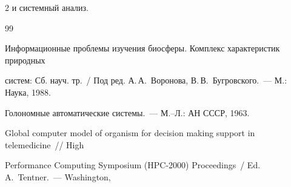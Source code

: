 \begin{multicols}{2}
и системный анализ.





{\small\frenchspacing


{%




\begin{thebibliography}{99}







Информационные проблемы изучения биосферы. Комплекс характеристик природных 


систем: Сб. науч. тр.~/ Под ред. А.\,А.~Воронова, В.\,В.~Бугровского.~--- М.: Наука, 1988.































Голономные автоматические сис\-те\-мы.~--- М.--Л.: АН СССР, 1963.









Global computer model of organism for decision making support in telemedicine~// High 


Performance Computing Symposium (HPC-2000) Proceedings~/ Ed. A.~Tentner.~--- Washington, 



\end{thebibliography}}}
\end{multicols}
